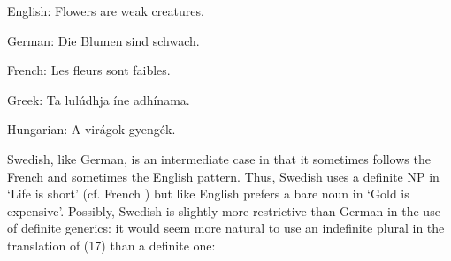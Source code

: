 English: Flowers are weak creatures.



\item 

German: Die Blumen sind schwach.

\item 

French: Les fleurs sont faibles.


\item 

Greek: Ta lulúdhja íne adhínama.


\item 

Hungarian: A virágok gyengék.



Swedish, like German, is an intermediate case in that it sometimes follows the French and sometimes the English pattern. Thus, Swedish uses a definite NP in  ‘Life is short’ (cf. French ) but like English prefers a bare noun in  ‘Gold is expensive’. Possibly, Swedish is slightly more restrictive than German in the use of definite generics: it would seem more natural to use an indefinite plural in the translation of (17) than a definite one:


\item 

